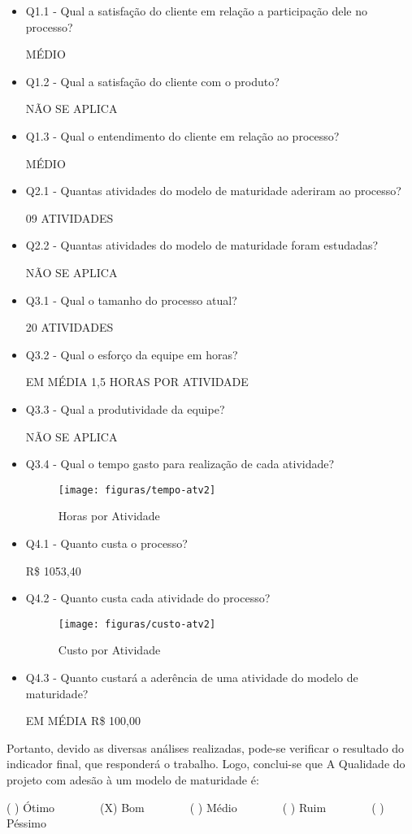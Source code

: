 \begin{itemize}
\item Q1.1 - Qual a satisfação do cliente em relação a participação dele no processo?

MÉDIO

\item Q1.2 - Qual a satisfação do cliente com o produto?

NÃO SE APLICA

\item Q1.3 - Qual o entendimento do cliente em relação ao processo?

MÉDIO

\item Q2.1 - Quantas atividades do modelo de maturidade aderiram ao processo?

09 ATIVIDADES

\item Q2.2 - Quantas atividades do modelo de maturidade foram estudadas?

NÃO SE APLICA

\item Q3.1 - Qual o tamanho do processo atual?

20 ATIVIDADES

\item Q3.2 - Qual o esforço da equipe em horas?

EM MÉDIA 1,5 HORAS POR ATIVIDADE

\item Q3.3 - Qual a produtividade da equipe?

NÃO SE APLICA

\item Q3.4 - Qual o tempo gasto para realização de cada atividade?


\begin{figure}[H]
  \center
  \texttt{[image: figuras/tempo-atv2]}
  \caption{Horas por Atividade}
  \label{fig:tempo-atv2}
\end{figure}

\item Q4.1 - Quanto custa o processo?

R\$ 1053,40

\item Q4.2 - Quanto custa cada atividade do processo?


\begin{figure}[H]
  \center
  \texttt{[image: figuras/custo-atv2]}
  \caption{Custo por Atividade}
  \label{fig:custo-atv2}
\end{figure}

\item Q4.3 - Quanto custará a aderência de uma atividade do modelo de maturidade?

EM MÉDIA R\$ 100,00

\end{itemize}

Portanto, devido as diversas análises realizadas, pode-se verificar o resultado do indicador final, que responderá o trabalho. Logo, conclui-se que A Qualidade do projeto com adesão à um modelo de maturidade é:

( ) Ótimo~~~~~~~~(X) Bom~~~~~~~~( ) Médio~~~~~~~~( ) Ruim~~~~~~~~( ) Péssimo

